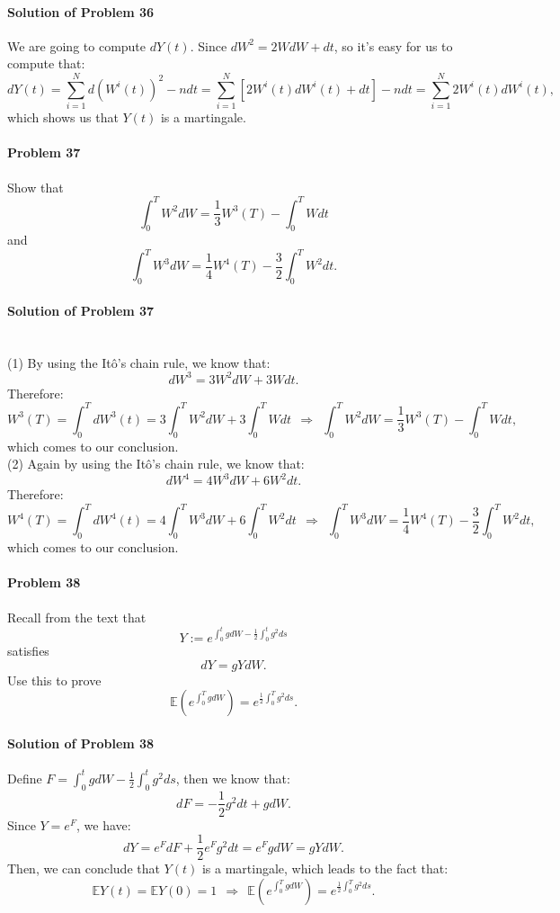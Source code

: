 \documentclass{article}
\begin{document}
\paragraph{Solution of Problem 36} We are going to compute $dY(t)$. Since $dW^2 = 2WdW+ dt$, so it's easy for us to compute that:
\[dY(t) = \sum_{i=1}^{N} d(W^i(t))^2 - ndt = \sum_{i=1}^{N} \left[2W^i(t) dW^i(t) + dt\right]-ndt = \sum_{i=1}^{N} 2W^i(t) dW^i(t),\]
which shows us that $Y(t)$ is a martingale.

\paragraph{Problem 37} Show that
\[\int_0^T W^2dW = \frac13 W^3(T)-\int_0^T Wdt\]
and 
\[\int_0^T W^3 dW = \frac14 W^4(T) - \frac32 \int_0^T W^2dt.\]

\paragraph{Solution of Problem 37}~\\
(1) By using the Itô's chain rule, we know that:
\[dW^3 = 3W^2 dW + 3W dt.\]
Therefore:
\[W^3(T)=\int_0^T dW^3(t) = 3\int_0^T W^2 dW + 3\int_0^T Wdt~~\Rightarrow~~\int_0^T W^2 dW=\frac13 W^3(T)-\int_0^T Wdt,\]
which comes to our conclusion.\\

(2) Again by using the Itô's chain rule, we know that:
\[dW^4 = 4W^3 dW + 6W^2 dt.\]
Therefore:
\[W^4(T)=\int_0^T dW^4(t) = 4\int_0^T W^3 dW + 6\int_0^T W^2 dt~~\Rightarrow~~\int_0^T W^3 dW=\frac14 W^4(T)-\frac32 \int_0^T W^2 dt,\]
which comes to our conclusion. 


\paragraph{Problem 38} Recall from the text that 
\[Y := e^{\int_0^t gdW - \frac12 \int_0^t g^2 ds}\]
satisfies 
\[dY = gYdW.\]
Use this to prove 
\[\mathbb{E}\left(e^{\int_0^T gdW}\right)=e^{\frac12 \int_0^T g^2 ds}.\]


\paragraph{Solution of Problem 38} Define $F = \int_0^t gdW - \frac12 \int_0^t g^2 ds$, then we know that:
\[dF = - \frac12 g^2 dt + gdW.\]
Since $Y=e^F$, we have:
\[dY = e^F dF + \frac12 e^F g^2dt = e^F gdW = gY dW.\]
Then, we can conclude that $Y(t)$ is a martingale, which leads to the fact that:
\[\mathbb{E}Y(t)=\mathbb{E}Y(0)=1~~\Rightarrow~~\mathbb{E}\left(e^{\int_0^T gdW}\right)=e^{\frac12 \int_0^T g^2 ds}.\]
\end{document}
